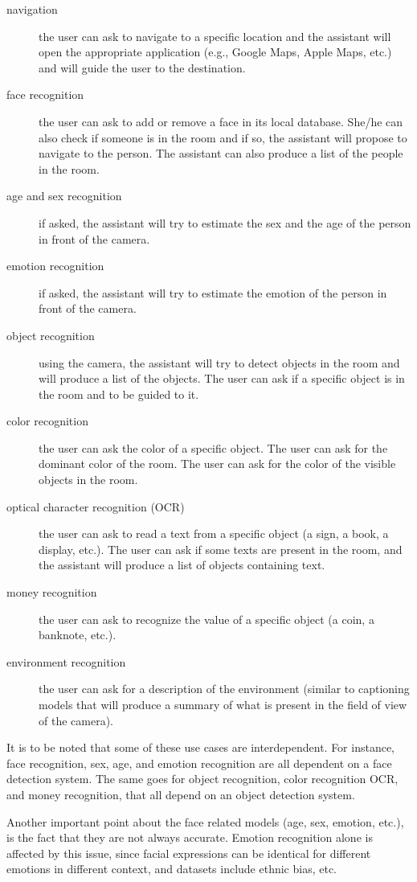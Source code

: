 \documentclass[sigconf]{acmart}
\begin{document}
\begin{description}
  \item[navigation] the user can ask to navigate to a specific location and the assistant will open the appropriate application (e.g., Google Maps, Apple Maps, etc.) and will guide the user to the destination.
  \item[face recognition] the user can ask to add or remove a face in its local database. She/he can also check if someone is in the room and if so, the assistant will propose to navigate to the person. The assistant can also produce a list of the people in the room.
  \item[age and sex recognition] if asked, the assistant will try to estimate the sex and the age of the person in front of the camera.
  \item[emotion recognition] if asked, the assistant will try to estimate the emotion of the person in front of the camera.
  \item[object recognition] using the camera, the assistant will try to detect objects in the room and will produce a list of the objects. The user can ask if a specific object is in the room and to be guided to it.
  \item[color recognition] the user can ask the color of a specific object. The user can ask for the dominant color of the room. The user can ask for the color of the visible objects in the room.
  \item[optical character recognition (OCR)] the user can ask to read a text from a specific object (a sign, a book, a display, etc.). The user can ask if some texts are present in the room, and the assistant will produce a list of objects containing text.
  \item[money recognition] the user can ask to recognize the value of a specific object (a coin, a banknote, etc.).
  \item[environment recognition] the user can ask for a description of the environment (similar to captioning models that will produce a summary of what is present in the field of view of the camera).
\end{description}

It is to be noted that some of these use cases are interdependent. For instance, face recognition, sex, age, and emotion recognition are all dependent on a face detection system. The same goes for object recognition, color recognition OCR, and money recognition, that all depend on an object detection system.

Another important point about the face related models (age, sex, emotion, etc.), is the fact that they are not always accurate\cite{sitnflashRacialDiscriminationFace2020}. Emotion recognition alone is affected by this issue, since facial expressions can be identical for different emotions in different context, and datasets include ethnic bias, etc.\cite{drozdowskiDemographicBiasBiometrics2020, duprePerformanceComparisonEight2020}
\end{document}
